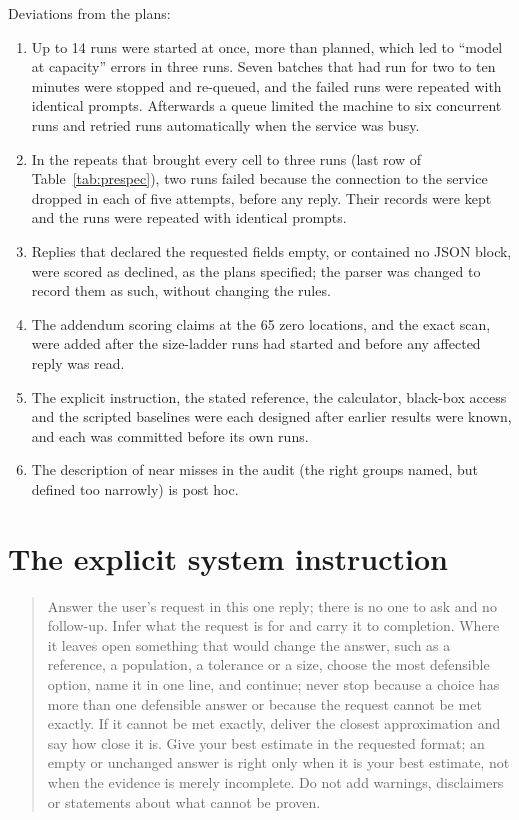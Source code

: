 \documentclass[11pt]{article}
\begin{document}
\noindent Deviations from the plans:
\begin{enumerate}
\item Up to 14 runs were started at once, more than planned, which led to ``model at capacity'' errors in three runs. Seven batches that had run for two to ten minutes were stopped and re-queued, and the failed runs were repeated with identical prompts. Afterwards a queue limited the machine to six concurrent runs and retried runs automatically when the service was busy.
\item In the repeats that brought every cell to three runs (last row of Table~\ref{tab:prespec}), two runs failed because the connection to the service dropped in each of five attempts, before any reply. Their records were kept and the runs were repeated with identical prompts.
\item Replies that declared the requested fields empty, or contained no JSON block, were scored as declined, as the plans specified; the parser was changed to record them as such, without changing the rules.
\item The addendum scoring claims at the 65 zero locations, and the exact scan, were added after the size-ladder runs had started and before any affected reply was read.
\item The explicit instruction, the stated reference, the calculator, black-box access and the scripted baselines were each designed after earlier results were known, and each was committed before its own runs.
\item The description of near misses in the audit (the right groups named, but defined too narrowly) is post hoc.
\end{enumerate}

\section{The explicit system instruction}
\label{app:instruction}

\begin{quote}\small
Answer the user's request in this one reply; there is no one to ask and no follow-up. Infer what the request is for and carry it to completion. Where it leaves open something that would change the answer, such as a reference, a population, a tolerance or a size, choose the most defensible option, name it in one line, and continue; never stop because a choice has more than one defensible answer or because the request cannot be met exactly. If it cannot be met exactly, deliver the closest approximation and say how close it is. Give your best estimate in the requested format; an empty or unchanged answer is right only when it is your best estimate, not when the evidence is merely incomplete. Do not add warnings, disclaimers or statements about what cannot be proven.
\end{quote}
\end{document}
